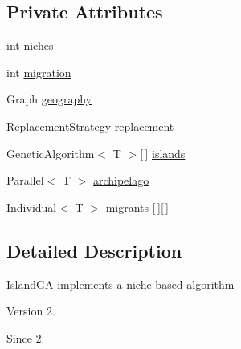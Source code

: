 \subsection*{Private Attributes}
\begin{DoxyCompactItemize}
\item 
int \hyperlink{classjenes_1_1algorithms_1_1_island_g_a_3_01_t_01extends_01_chromosome_01_4_a02fc5f134e4e02b3a29afc3bce1ab46f}{niches}
\item 
int \hyperlink{classjenes_1_1algorithms_1_1_island_g_a_3_01_t_01extends_01_chromosome_01_4_a9bba629926d756819b7725f170b76fd4}{migration}
\item 
Graph \hyperlink{classjenes_1_1algorithms_1_1_island_g_a_3_01_t_01extends_01_chromosome_01_4_aa12c57824b7d6a8e875a75c07d9ad774}{geography}
\item 
Replacement\-Strategy \hyperlink{classjenes_1_1algorithms_1_1_island_g_a_3_01_t_01extends_01_chromosome_01_4_ab3796d8a249ad849e429bf8b996fb720}{replacement}
\item 
Genetic\-Algorithm$<$ T $>$\mbox{[}$\,$\mbox{]} \hyperlink{classjenes_1_1algorithms_1_1_island_g_a_3_01_t_01extends_01_chromosome_01_4_a836de3d7431d26f866ea38cc16ac20bb}{islands}
\item 
Parallel$<$ T $>$ \hyperlink{classjenes_1_1algorithms_1_1_island_g_a_3_01_t_01extends_01_chromosome_01_4_a8fee853479aae095ab664c153087ffbd}{archipelago}
\item 
Individual$<$ T $>$ \hyperlink{classjenes_1_1algorithms_1_1_island_g_a_3_01_t_01extends_01_chromosome_01_4_a735171ab63805fccccdc5f87941fdfe2}{migrants} \mbox{[}$\,$\mbox{]}\mbox{[}$\,$\mbox{]}
\end{DoxyCompactItemize}


\subsection{Detailed Description}
Island\-G\-A implements a niche based algorithm

\begin{DoxyVersion}{Version}
2. 
\end{DoxyVersion}
\begin{DoxySince}{Since}
2. 
\end{DoxySince}



